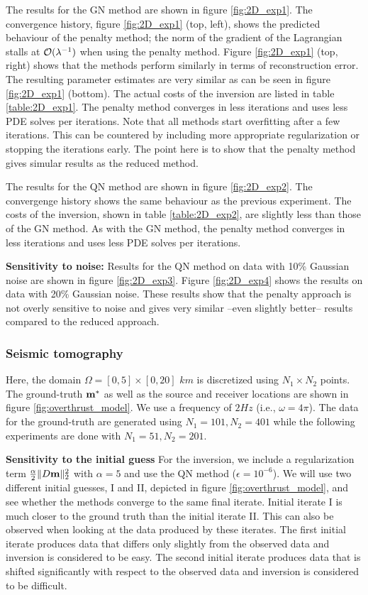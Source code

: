 \documentclass{iopart}
\begin{document}
The results for the GN method are shown in figure \ref{fig:2D_exp1}.
The convergence history, figure \ref{fig:2D_exp1} (top, left), shows the predicted behaviour of the penalty method; the norm of the gradient of the Lagrangian stalls at $\mathcal{O}(\lambda^{-1})$ when using the penalty method. 
Figure \ref{fig:2D_exp1} (top, right) shows that the methods perform similarly in terms of reconstruction error. The resulting parameter estimates are very similar as can be seen 
in figure \ref{fig:2D_exp1} (bottom). The actual costs of the inversion are listed in table \ref{table:2D_exp1}. The penalty method converges in less iterations and uses less PDE solves per iterations. Note that all methods start overfitting after a few iterations. This can be countered by including more appropriate regularization or stopping the iterations early. The point here is to show that the penalty method gives simular results as the reduced method.

The results for the QN method are shown in figure \ref{fig:2D_exp2}. The convergenge history shows the same behaviour as the previous experiment. The costs of the inversion, shown in table \ref{table:2D_exp2}, are slightly less than those of the GN method. As with the GN method, the penalty method converges in less iterations and uses less PDE solves per iterations. 

\textbf{Sensitivity to noise:}
Results for the QN method on data with 10\% Gaussian noise are shown in figure  \ref{fig:2D_exp3}. Figure \ref{fig:2D_exp4} shows the results on data with 20\% Gaussian noise. These results show that the penalty approach is not overly sensitive to noise and gives very similar --even slightly better-- results compared to the reduced approach.

\subsubsection{Seismic tomography}
Here, the domain $\Omega = [0,5]\times [0,20]$ $km$ is discretized using $N_1\times N_2$ points. The ground-truth $\mathbf{m}^*$ as well as the source and receiver locations are shown in figure \ref{fig:overthrust_model}. We use a frequency of $2 Hz$ (i.e., $\omega = 4\pi$). The data for the ground-truth are generated using $N_1=101, N_2=401$ while the following experiments are done with $N_1=51, N_2=201$. 

\textbf{Sensitivity to the initial guess}
For the inversion, we include a regularization term $\frac{\alpha}{2} \|D\mathbf{m}\|_2^2$ with $\alpha = 5$ and use the QN method ($\epsilon=10^{-6}$). We will use two different initial guesses, I and II, depicted in figure \ref{fig:overthrust_model}, and see whether the methods converge to the same final iterate. Initial iterate I is much closer to the ground truth than the initial iterate II. This can also be observed when looking at the data produced by these iterates. The first initial iterate produces data that differs only slightly from the observed data and inversion is considered to be easy. The second initial iterate produces data that is shifted significantly with respect to the observed data and inversion is considered to be difficult.
\end{document}
